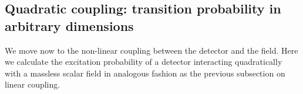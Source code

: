 \documentclass[prd,twocolumn,superscriptaddress,nofootinbib,floatfix,amsmath,amssymb]{revtex4-2}
\begin{document}
    
    
    
   
    
    
    
    	
    	
	
    \subsection{Quadratic coupling: transition probability in arbitrary dimensions}
    
    We move now to the non-linear coupling between the detector and the field. Here we calculate the excitation probability of a detector interacting quadratically with a massless scalar field in analogous fashion as the previous subsection on linear coupling. 
    
\end{document}
